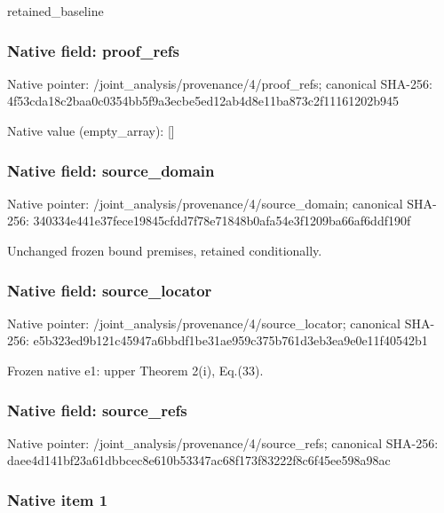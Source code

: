 \documentclass[10pt,a4paper]{article}
\begin{document}
retained\_baseline


\subsubsection{Native field: proof\_refs}


Native pointer: /joint\_analysis/provenance/4/proof\_refs; canonical SHA-256: 4f53cda18c2baa0c0354bb5f\allowbreak{}9a3ecbe5ed12ab4d8e11ba87\allowbreak{}3c2f11161202b945



Native value (empty\_array): []



\subsubsection{Native field: source\_domain}


Native pointer: /joint\_analysis/provenan\allowbreak{}ce/4/source\_domain; canonical SHA-256: 340334e441e37fece19845cf\allowbreak{}dd7f78e71848b0afa54e3f12\allowbreak{}09ba66af6ddf190f


Unchanged frozen bound premises, retained conditionally.


\subsubsection{Native field: source\_locator}


Native pointer: /joint\_analysis/provenan\allowbreak{}ce/4/source\_locator; canonical SHA-256: e5b323ed9b121c45947a6bbd\allowbreak{}f1be31ae959c375b761d3eb3\allowbreak{}ea9e0e11f40542b1


Frozen native e1: upper Theorem 2(i), Eq.(33).


\subsubsection{Native field: source\_refs}


Native pointer: /joint\_analysis/provenan\allowbreak{}ce/4/source\_refs; canonical SHA-256: daee4d141bf23a61dbbcec8e\allowbreak{}610b53347ac68f173f83222f\allowbreak{}8c6f45ee598a98ac



\subsubsection{Native item 1}
\end{document}
